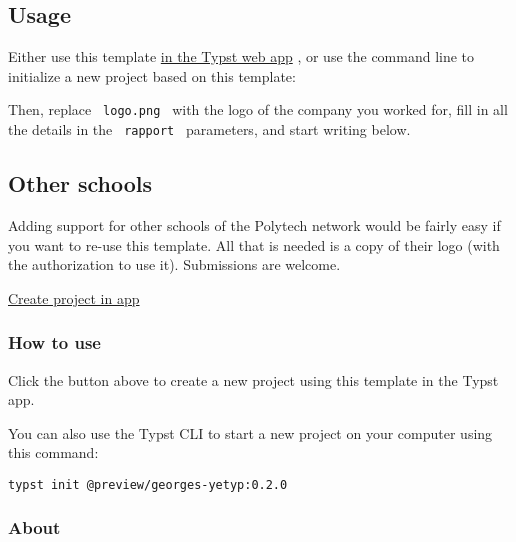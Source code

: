 \subsection{Usage}\label{usage}

Either use this template
\href{https://typst.app/?template=georges-yetyp&version=0.1.0}{in the
Typst web app} , or use the command line to initialize a new project
based on this template:

\begin{Shaded}
\begin{Highlighting}[]
\end{Highlighting}
\end{Shaded}

Then, replace \texttt{\ logo.png\ } with the logo of the company you
worked for, fill in all the details in the \texttt{\ rapport\ }
parameters, and start writing below.

\subsection{Other schools}\label{other-schools}

Adding support for other schools of the Polytech network would be fairly
easy if you want to re-use this template. All that is needed is a copy
of their logo (with the authorization to use it). Submissions are
welcome.

\href{/app?template=georges-yetyp&version=0.2.0}{Create project in app}

\subsubsection{How to use}\label{how-to-use}

Click the button above to create a new project using this template in
the Typst app.

You can also use the Typst CLI to start a new project on your computer
using this command:

\begin{verbatim}
typst init @preview/georges-yetyp:0.2.0
\end{verbatim}



\subsubsection{About}\label{about}

